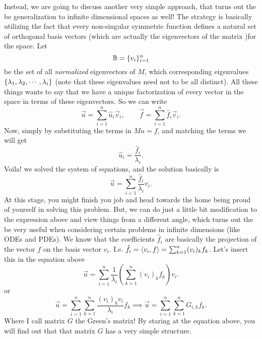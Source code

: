 Instead, we are going to discuss another very simple approach, that turns out the be generalization to infinite dimensional spaces as well! The strategy is basically utilizing the fact that every non-singular symmetric function defines a natural set of orthogonal basis vectors (which are actually the eigenvectors of the matrix )for the space. Let 
\[ \mathbb{B} = \{v_i\}_{i=1}^{n} \]
be the set of all \emph{normalized }eigenvectors of $M$, which corresponding eigenvalues $\{\lambda_1, \lambda_2, \cdots, \lambda_i\}$ (note that these eigenvalues need not to be all distinct). All these things wants to say that we have a unique factorization of every vector in the space in terms of these eigenvectors. So we can write
\[ \vec{u} = \sum_{i=1}^{n} \hat{u}_i \vec{v}_i, \qquad \vec{f} = \sum_{i=1}^{n} \hat{f}_i \vec{v}_i.   \]
Now, simply by substituting the terms in $Mu = f$, and matching the terms we will get
\[  \hat{u}_i = \frac{\hat{f}_i}{\lambda_i}.  \] 
Voila! we solved the system of equations, and the solution basically is
\[ \vec{u} = \sum_{i=1}^{n} \frac{\hat{f}_i}{\lambda_i} v_i. \]
At this stage, you might finish you job and head towards the home being proud of yourself in solving this problem. But, we can do just a little bit modification to the expression above and view things from a different angle, which turns out the be very useful when considering certain problems in infinite dimensions (like ODEs and PDEs). We know that the coefficients $\hat{f}_i$ are basically the projection of the vector $f$ on the basis vector $v_i$. I.e. $\hat{f}_i = \langle v_i, f \rangle = \sum_{k=1}^{n}(v_i)_k f_k$. Let's insert this in the equation above
\[ \vec{u} = \sum_{i=1}^{n} \frac{1}{\lambda_i} (\sum_{k=1}^{n} (v_i)_k f_k) v_i.  \]
or
\[ \vec{u} = \sum_{i=1}^{n}  \sum_{k=1}^{n} \frac{(v_i)_k v_i}{\lambda_i} f_k \implies \boxed{\vec{u}= \sum_{i=1}^{n}  \sum_{k=1}^{n} G_{i,k} f_k}. \]
Where I call matrix $G$ the Green's matrix! By staring at the equation above, you will find out that that matrix $G$ has a very simple structure. 

